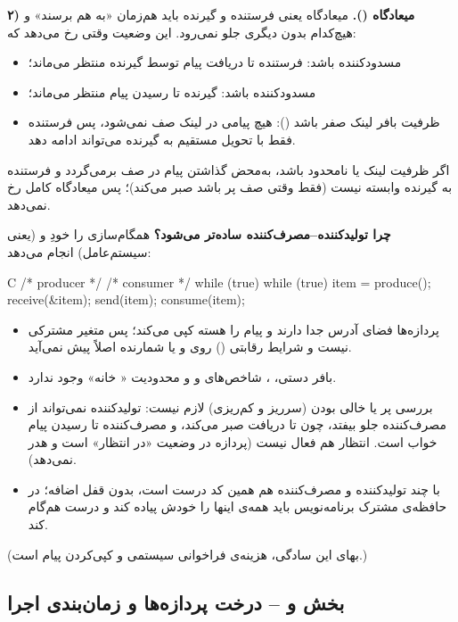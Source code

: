 \textbf{۲) میعادگاه ().} میعادگاه یعنی فرستنده و گیرنده باید هم‌زمان «به هم برسند» و هیچ‌کدام بدون دیگری جلو نمی‌رود. این وضعیت وقتی رخ می‌دهد که:
\begin{itemize}
  \item {} مسدودکننده باشد: فرستنده تا دریافت پیام توسط گیرنده منتظر می‌ماند؛
  \item {} مسدودکننده باشد: گیرنده تا رسیدن پیام منتظر می‌ماند؛
  \item ظرفیت بافر لینک صفر باشد (): هیچ پیامی در لینک صف نمی‌شود، پس فرستنده فقط با تحویل مستقیم به گیرنده می‌تواند ادامه دهد.
\end{itemize}
اگر ظرفیت لینک  یا نامحدود باشد،  به‌محض گذاشتن پیام در صف برمی‌گردد و فرستنده به گیرنده وابسته نیست (فقط وقتی صف پر باشد صبر می‌کند)؛ پس میعادگاه کامل رخ نمی‌دهد.

\textbf{چرا تولیدکننده–مصرف‌کننده ساده‌تر می‌شود؟} همگام‌سازی را خودِ  و  (یعنی سیستم‌عامل) انجام می‌دهد:
\begin{codebox}[title=message passing]{C}
/* producer */                       /* consumer */
while (true) {                       while (true) {
    item = produce();                    receive(&item);
    send(item);                          consume(item);
}                                    }
\end{codebox}
\begin{itemize}
  \item پردازه‌ها فضای آدرس جدا دارند و پیام را هسته کپی می‌کند؛ پس متغیر مشترکی نیست و شرایط رقابتی () روی  و  یا شمارنده اصلاً پیش نمی‌آید.
  \item بافر دستی، ، شاخص‌های  و  و محدودیت « خانه» وجود ندارد.
  \item بررسی پر یا خالی بودن (سرریز و کم‌ریزی) لازم نیست: تولیدکننده نمی‌تواند از مصرف‌کننده جلو بیفتد، چون  تا دریافت صبر می‌کند، و مصرف‌کننده تا رسیدن پیام خواب است. انتظار هم فعال نیست (پردازه در وضعیت «در انتظار» است و  هدر نمی‌دهد).
  \item با چند تولیدکننده و مصرف‌کننده هم همین کد درست است، بدون قفل اضافه؛ در حافظه‌ی مشترک برنامه‌نویس باید همه‌ی اینها را خودش پیاده کند و درست هم‌گام کند.
\end{itemize}
(بهای این سادگی، هزینه‌ی فراخوانی سیستمی و کپی‌کردن پیام است.)

\subsection*{بخش و – درخت پردازه‌ها و زمان‌بندی اجرا}

